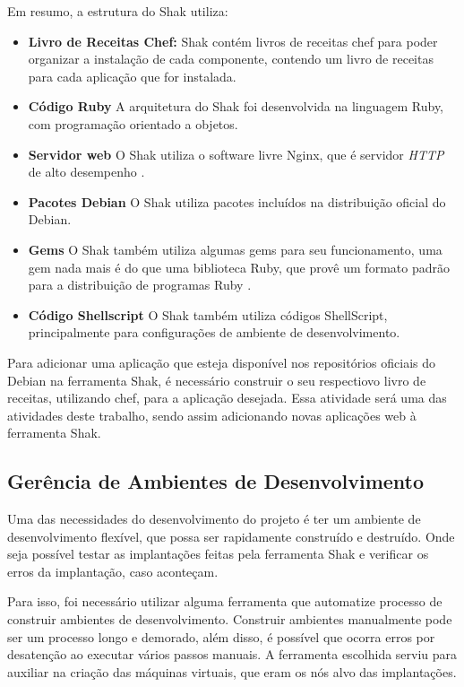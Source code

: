 Em resumo, a estrutura do Shak utiliza:

\begin{itemize}
  \item  \textbf{Livro de Receitas Chef:} Shak contém livros de receitas chef
  para poder organizar a instalação de cada componente, contendo um livro
  de receitas para cada aplicação que for instalada.
  \item  \textbf{Código Ruby} A arquitetura do Shak foi desenvolvida na linguagem
  Ruby, com programação orientado a objetos.
  \item  \textbf{Servidor web} O Shak utiliza o software livre Nginx, que é
  servidor \textit{HTTP} de alto desempenho \cite{nginx}.
  \item  \textbf{Pacotes Debian} O Shak utiliza pacotes incluídos na distribuição
  oficial do Debian.
  \item  \textbf{Gems} O Shak também utiliza algumas gems para seu funcionamento,
  uma gem nada mais é do que uma biblioteca Ruby, que provê um formato padrão para
  a distribuição de programas Ruby \cite{gem}.
  \item  \textbf{Código Shellscript} O Shak também utiliza códigos ShellScript,
  principalmente para configurações de ambiente de desenvolvimento. 
\end{itemize}

Para adicionar uma aplicação que esteja disponível nos repositórios oficiais
do Debian na ferramenta Shak, é necessário construir o seu respectiovo 
livro de receitas, utilizando chef, para a
aplicação desejada. Essa atividade será uma das atividades deste trabalho, sendo assim
adicionando novas aplicações web à ferramenta Shak.

\subsection{Gerência de Ambientes de Desenvolvimento}

Uma das necessidades do desenvolvimento do projeto é ter um ambiente de desenvolvimento
flexível, que possa ser rapidamente construído e destruído. Onde seja possível 
testar as implantações feitas pela ferramenta Shak e verificar os erros da implantação, caso 
aconteçam. 

Para isso, foi necessário utilizar alguma ferramenta que automatize processo de 
construir ambientes de desenvolvimento. Construir ambientes manualmente pode
ser um processo longo e demorado, além disso, é possível que ocorra erros por
desatenção ao executar vários passos manuais. A ferramenta escolhida serviu para
auxiliar na criação das máquinas virtuais, que eram os nós alvo 
das implantações.

